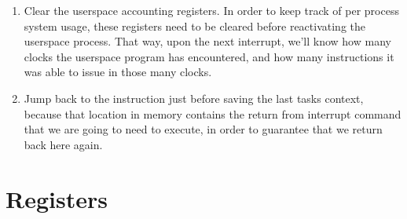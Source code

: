 \documentclass{gqtekspec}
\begin{document}
\begin{enumerate}
\item Clear the userspace accounting registers.  In order to keep track of
	per process system usage, these registers need to be cleared before
	reactivating the userspace process.  That way, upon the next
	interrupt, we'll know how many clocks the userspace program has
	encountered, and how many instructions it was able to issue in
	those many clocks. 

\item Jump back to the instruction just before saving the last tasks context,
	because that location in memory contains the return from interrupt
	command that we are going to need to execute, in order to guarantee
	that we return back here again.
\end{enumerate}

\chapter{Registers}\label{chap:regs}
\end{document}

